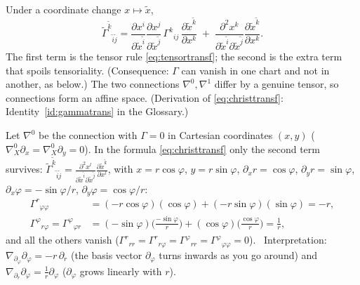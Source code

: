 \begin{formal}
Under a coordinate change $x\mapsto\tilde x$,
\begin{equation}\label{eq:christtransf}
\tilde\Gamma^{\tilde k}{}_{\tilde i\tilde j}=\frac{\partial x^i}{\partial\tilde x^{\tilde i}}\frac{\partial x^j}{\partial\tilde x^{\tilde j}}\,\Gamma^k{}_{ij}\,\frac{\partial\tilde x^{\tilde k}}{\partial x^k}\;+\;\frac{\partial^2x^k}{\partial\tilde x^{\tilde i}\partial\tilde x^{\tilde j}}\frac{\partial\tilde x^{\tilde k}}{\partial x^k}.
\end{equation}
The first term is the tensor rule \eqref{eq:tensortransf}; the second is the extra term that spoils tensoriality. (Consequence: $\Gamma$ can vanish in one chart and not in another, as below.) The two connections $\nabla^0,\nabla^1$ differ by a genuine tensor, so connections form an affine space. (Derivation of \eqref{eq:christtransf}: Identity~\ref{id:gammatrans} in the Glossary.)%
\end{formal}

\begin{example}
Let $\nabla^0$ be the connection with $\Gamma=0$ in Cartesian coordinates $(x,y)$ (\ie $\nabla^0_X\partial_x=\nabla^0_X\partial_y=0$). In the formula \eqref{eq:christtransf} only the second term survives:
$\tilde\Gamma^{\tilde k}{}_{\tilde i\tilde j}=\frac{\partial^2x^l}{\partial\tilde x^{\tilde i}\partial\tilde x^{\tilde j}}\frac{\partial\tilde x^{\tilde k}}{\partial x^l}$, with $x=r\cos\varphi$, $y=r\sin\varphi$, $\partial_xr=\cos\varphi$, $\partial_yr=\sin\varphi$, $\partial_x\varphi=-\sin\varphi/r$, $\partial_y\varphi=\cos\varphi/r$:
\begin{align*}
\Gamma^r{}_{\varphi\varphi}&=(-r\cos\varphi)(\cos\varphi)+(-r\sin\varphi)(\sin\varphi)=-r,\\
\Gamma^\varphi{}_{r\varphi}=\Gamma^\varphi{}_{\varphi r}&=(-\sin\varphi)\Big(\tfrac{-\sin\varphi}{r}\Big)+(\cos\varphi)\Big(\tfrac{\cos\varphi}{r}\Big)=\tfrac1r,
\end{align*}
and all the others vanish ($\Gamma^r{}_{rr}=\Gamma^r{}_{r\varphi}=\Gamma^\varphi{}_{rr}=\Gamma^\varphi{}_{\varphi\varphi}=0$). \checkmark\ Interpretation: $\nabla_{\partial_\varphi}\partial_\varphi=-r\,\partial_r$ (the basis vector $\partial_\varphi$ turns inwards as you go around) and $\nabla_{\partial_r}\partial_\varphi=\frac1r\partial_\varphi$ ($\partial_\varphi$ grows linearly with $r$).
\end{example}

